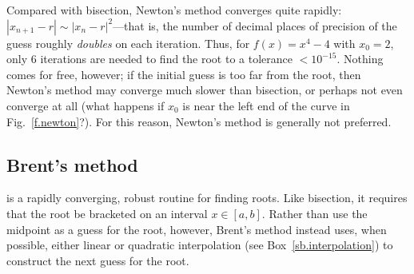 Compared with bisection, Newton's method converges quite rapidly: $|x_{n+1}-r| \sim |x_{n}-r|^{2}$---that is, the number of decimal places of precision of the guess roughly \emph{doubles} on each iteration.  Thus, for  $f(x) = x^{4}-4$ with $x_{0}=2$, only 6 iterations are needed to find the root to a tolerance $< 10^{-15}$. Nothing comes for free, however; if the initial guess is too far from the root, then Newton's method may converge much slower than bisection, or perhaps not even converge at all (what happens if $x_{0}$ is near the left end of the curve in Fig.~\ref{f.newton}?).
For this reason, Newton's method is generally not preferred.

\subsection{Brent's method}
\cite{Brent1973Algorithms-for-} is a rapidly converging, robust routine for finding roots. Like bisection, it requires that the root be bracketed on an interval $x\in[a,b]$. Rather than use the midpoint as a guess for the root, however, Brent's method instead uses, when possible, either linear or quadratic interpolation (see Box~\ref{sb.interpolation}) to construct the next guess for the root.

